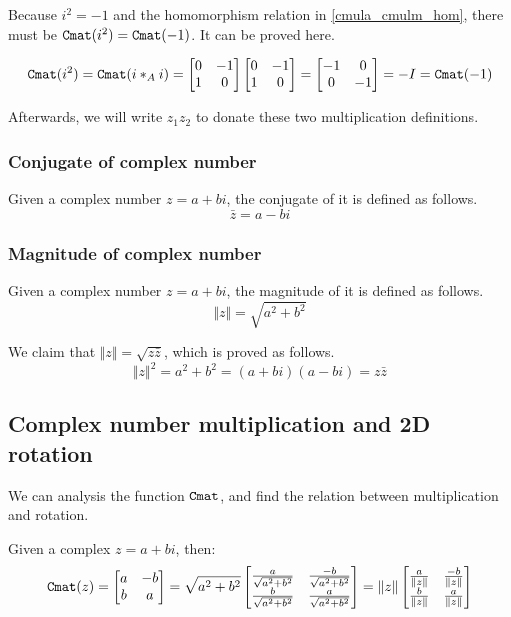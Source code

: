 \documentclass[runningheads]{llncs}
\newcommand{\Clen}[1]{\Vert #1\Vert}
\newcommand{\bmatL}{\begin{bmatrix}}
\newcommand{\bmatR}{\end{bmatrix}}
\begin{document}
Because $i^2=-1$ and the homomorphism relation in \eqref{cmula_cmulm_hom}, there must be $\Cmat{i^2}=\Cmat{-1}$.
It can be proved here.

\begin{equation}
  \Cmat{i^2}=\Cmat{i *_A i}
  =\bmatL 0&-1\\1&0\bmatR \bmatL 0&-1\\1&0\bmatR 
  =\bmatL -1&0\\0&-1\bmatR 
  =-I
  =\Cmat{-1}
\end{equation}

Afterwards, we will write $z_1z_2$ to donate these two multiplication definitions.

\subsubsection{Conjugate of complex number}
Given a complex number $z=a+bi$, the conjugate of it is defined as follows.
\begin{equation}
  \bar{z}=a-bi
\end{equation}

\subsubsection{Magnitude of complex number}
Given a complex number $z=a+bi$, the magnitude of it is defined as follows.
\begin{equation}
  \Clen{z}=\sqrt{a^2+b^2}
\end{equation}

We claim that $\Clen{z}=\sqrt{z\bar{z}}$, which is proved as follows.
\begin{equation}
  \Clen{z}^2=a^2+b^2=(a+bi)(a-bi)=z\bar{z}
\end{equation}
    
\subsection{Complex number multiplication and 2D rotation}

We can analysis the function $\Cmat$, and find the relation between multiplication and rotation.

Given a complex $z=a+bi$, then:
\begin{equation}
  \Cmat{z}=\bmatL a&-b\\b&a\bmatR 
  =\sqrt{a^2+b^2}
  \bmatL \frac{a}{\sqrt{a^2+b^2}}&\frac{-b}{\sqrt{a^2+b^2}}\\
    \frac{b}{\sqrt{a^2+b^2}}&\frac{a}{\sqrt{a^2+b^2}}\bmatR 
  =\Clen{z}
  \bmatL \frac{a}{\Clen{z}}&\frac{-b}{\Clen{z}}\\
    \frac{b}{\Clen{z}}&\frac{a}{\Clen{z}}\bmatR 
\end{equation}
\end{document}
